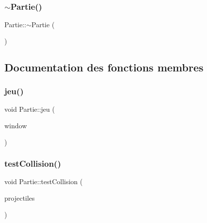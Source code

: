 \mbox{\label{class_partie_ae4afeb7336bb84427272cfb7018b5e3d}} 
\subsubsection{\texorpdfstring{$\sim$\+Partie()}{~Partie()}}
{\footnotesize\ttfamily Partie\+::$\sim$\+Partie (\begin{DoxyParamCaption}{ }\end{DoxyParamCaption})}



\subsection{Documentation des fonctions membres}
\mbox{\label{class_partie_afc91237df57c01383e558ef0cb127501}} 
\subsubsection{\texorpdfstring{jeu()}{jeu()}}
{\footnotesize\ttfamily void Partie\+::jeu (\begin{DoxyParamCaption}\item[{sf\+::\+Render\+Window \&}]{window }\end{DoxyParamCaption})}

\mbox{\label{class_partie_aae0457a6d531a2c2da83463a7fa66574}} 
\subsubsection{\texorpdfstring{test\+Collision()}{testCollision()}}
{\footnotesize\ttfamily void Partie\+::test\+Collision (\begin{DoxyParamCaption}\item[{std\+::vector$<$ \hyperlink{class_projectile}{Projectile} $\ast$$>$ \&}]{projectiles }\end{DoxyParamCaption})}

\mbox{\label{class_partie_aed9448d53e259a2b90dc371b0a02efae}} 

